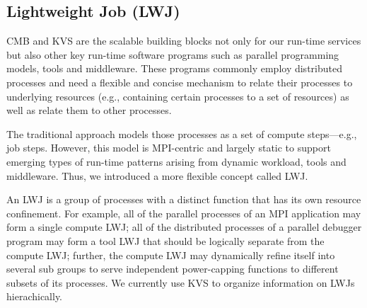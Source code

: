 \subsection{Lightweight Job (LWJ)}
CMB and KVS are the scalable building blocks not only for our run-time services 
but also other key run-time software programs such as parallel programming models, 
tools and middleware. These programs commonly employ distributed processes and need a 
flexible and concise mechanism to relate their processes to underlying resources 
(e.g., containing certain processes to a set of resources) as well as relate 
them to other processes. 

The traditional approach models those processes as
a set of compute steps---e.g., job steps. However, this model 
is MPI-centric and largely static to support emerging types
of run-time patterns arising from dynamic workload, tools and middleware.
Thus, we introduced a more flexible concept called LWJ.

An LWJ is a group
of processes with a distinct function that has its own resource confinement. 
For example, all of the parallel
processes of an MPI application may form a single compute LWJ; all of the distributed processes
of a parallel debugger program may form a tool LWJ that should be logically separate from the
compute LWJ; further, the compute LWJ may dynamically refine itself into several 
sub groups to serve independent power-capping functions to different subsets of its processes.
We currently use KVS to organize information on LWJs hierachically.
